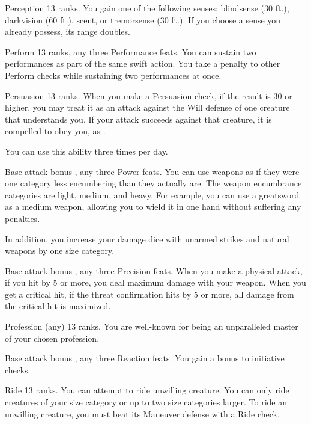 \featpre Perception 13 ranks.
\featben You gain one of the following senses: blindsense (30 ft.), darkvision (60 ft.), scent, or tremorsense (30 ft.). If you choose a sense you already possess, its range doubles.

\featpres Perform 13 ranks, any three Performance feats.
\featben You can sustain two performances as part of the same swift action. You take a  penalty to other Perform checks while sustaining two performances at once.

\featpres Persuasion 13 ranks.
\featben When you make a Persuasion check, if the result is 30 or higher, you may treat it as an attack against the Will defense of one creature that understands you. If your attack succeeds against that creature, it is compelled to obey you, as .

You can use this ability three times per day.

\featpres Base attack bonus , any three Power feats.
\featben You can use weapons as if they were one category less encumbering than they actually are. The weapon encumbrance categories are light, medium, and heavy. For example, you can use a greatsword as a medium weapon, allowing you to wield it in one hand without suffering any penalties.

In addition, you increase your damage dice with unarmed strikes and natural weapons by one size category.

\featpre Base attack bonus , any three Precision feats.
\featben When you make a physical attack, if you hit by 5 or more, you deal maximum damage with your weapon. When you get a critical hit, if the threat confirmation hits by 5 or more, all damage from the critical hit is maximized.

\featpre Profession (any) 13 ranks.
\featben You are well-known for being an unparalleled master of your chosen profession.

\featpre Base attack bonus , any three Reaction feats.
\featben You gain a  bonus to initiative checks.

\featpre Ride 13 ranks.
\featben You can attempt to ride unwilling creature. You can only ride creatures of your size category or up to two size categories larger. To ride an unwilling creature, you must beat its Maneuver defense with a Ride check.

